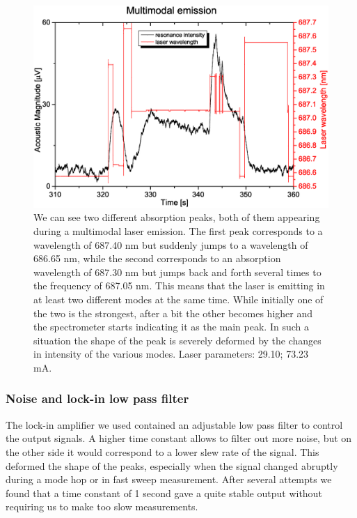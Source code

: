 \begin{figure}
\includegraphics[width=\linewidth, draft=\foto]{eps/multimode.eps}
\caption{We can see two different absorption peaks, both of them appearing during a multimodal laser emission. The first peak corresponds to a wavelength of 687.40 nm but suddenly jumps to a wavelength of 686.65 nm, while the second corresponds to an absorption wavelength of 687.30 nm but jumps back and forth several times to the frequency of 687.05 nm. This means that the laser is emitting in at least two different modes at the same time. While initially one of the two is the strongest, after a bit the other becomes higher and the spectrometer starts indicating it as the main peak. In such a situation the shape of the peak is severely deformed by the changes in intensity of the various modes.
Laser parameters: 29.10\cel; 73.23 mA.}
\label{multimodes}
\end{figure} 

\subsubsection{Noise and lock-in low pass filter}
The lock-in amplifier we used contained an adjustable low pass filter to control the output signals. A higher time constant allows to filter out more noise, but on the other side it would correspond to a lower slew rate of the signal. This deformed the shape of the peaks, especially when the signal changed abruptly during a mode hop or in fast sweep measurement. After several attempts we found that a time constant of 1 second gave a quite stable output without requiring us to make too slow measurements.